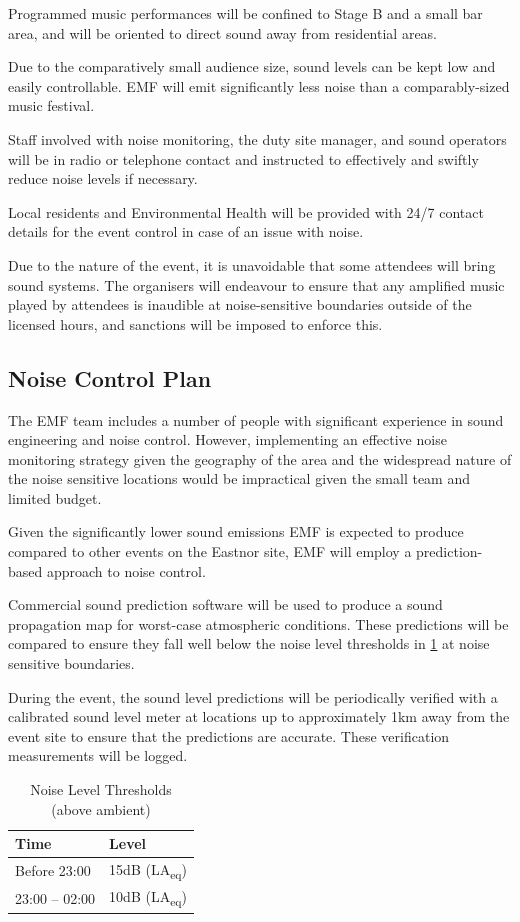 Programmed music performances will be confined to Stage B and a
small bar area, and will be oriented to direct sound away from residential areas.

Due to the comparatively small audience size, sound levels can be kept low and
easily controllable. EMF will emit significantly less noise than a comparably-sized
music festival.

Staff involved with noise monitoring, the duty site manager, and sound operators
will be in radio or telephone contact and instructed to effectively and swiftly
reduce noise levels if necessary.

Local residents and Environmental Health will be provided with 24/7 contact
details for the event control in case of an issue with noise.

Due to the nature of the event, it is unavoidable that some attendees will
bring sound systems.  The organisers will endeavour to ensure that any
amplified music played by attendees is inaudible at noise-sensitive boundaries
outside of the licensed hours, and sanctions will be imposed to enforce this.

\subsection{Noise Control Plan}
The EMF team includes a number of people with significant experience in sound 
engineering and noise control. However, implementing an effective noise monitoring
strategy given the geography of the area and the widespread nature of the noise
sensitive locations would be impractical given the small team and limited budget.

Given the significantly lower sound emissions EMF is expected to produce compared to
other events on the Eastnor site, EMF will employ a prediction-based approach to
noise control.

Commercial sound prediction software \cite{noizcalc} will be used to produce a sound
propagation map for worst-case atmospheric conditions. These predictions will be compared
to ensure they fall well below the noise level thresholds in \cref{table:noisethresholds}
at noise sensitive boundaries.

During the event, the sound level predictions will be periodically verified with a
calibrated sound level meter at locations up to approximately 1km away from the event
site to ensure that the predictions are accurate. These verification measurements will
be logged.

\begin{table}[h!]
    \caption{Noise Level Thresholds (above ambient)}
    \label{table:noisethresholds}
    \centering
    \begin{tabular}{| l l |}
        \hline
        \textbf{Time} & \textbf{Level} \\
        \hline
        Before 23:00 & 15dB (LA\textsubscript{eq}) \\
        23:00 -- 02:00 & 10dB (LA\textsubscript{eq}) \\
        \hline
    \end{tabular}
\end{table}


